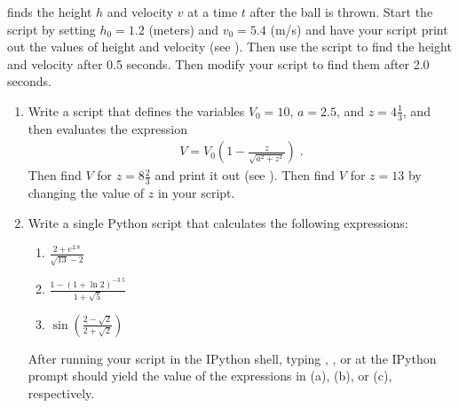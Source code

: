 \documentclass[letterpaper,10pt,english]{sphinxmanual}
\begin{document}
\sphinxAtStartPar
finds the height \(h\) and velocity \(v\) at a time \(t\) after the ball is thrown. Start the script by setting \(h_0 = 1.2\) (meters) and \(v_0 = 5.4\) (m/s) and have your script print out the values of height and velocity (see {\hyperref[\detokenize{chap2/chap2_basics:printnote}]{}}). Then use the script to find the height and velocity after 0.5 seconds. Then modify your script to find them after 2.0 seconds.
\begin{enumerate}
%
\item {} 
\sphinxAtStartPar
Write a script that defines the variables \(V_0 = 10\), \(a = 2.5\), and \(z = 4\tfrac{1}{3}\), and then evaluates the expression
\begin{equation*}
\begin{split}V = V_0 \left( 1 - \frac{z}{\sqrt{a^2+z^2}} \right) \;.\end{split}
\end{equation*}
\sphinxAtStartPar
Then find \(V\) for \(z=8\frac{2}{3}\) and print it out (see {\hyperref[\detokenize{chap2/chap2_basics:printnote}]{}}). Then find \(V\) for \(z=13\) by changing the value of \(z\) in your script.

\item {} 
\sphinxAtStartPar
Write a single Python script that calculates the following expressions:
\begin{enumerate}
%
\item {} 
\sphinxAtStartPar
\(\displaystyle\frac{2 + e^{2.8}}{\sqrt{13}-2}\)

\item {} 
\sphinxAtStartPar
\(\displaystyle\frac{1-(1+\ln 2)^{-3.5}}{1+\sqrt{5}}\)

\item {} 
\sphinxAtStartPar
\(\displaystyle\sin\left( \frac{2-\sqrt{2}}{2+\sqrt{2}} \right)\)

\end{enumerate}

\sphinxAtStartPar
After running your script in the IPython shell, typing , , or  at the IPython prompt should yield the value of the expressions in (a), (b), or (c), respectively.


\end{enumerate}
\end{document}
